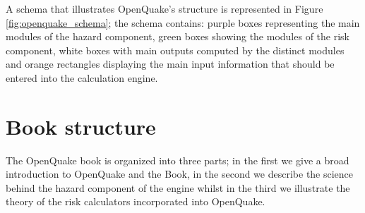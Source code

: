 A schema that illustrates OpenQuake's structure is 
represented in Figure \ref{fig:openquake_schema}; the schema contains:
purple boxes representing the main modules of the hazard component, 
green boxes showing the modules of the risk component, white boxes
with main outputs computed by the distinct modules and orange rectangles
displaying the main input information that should be entered into the calculation engine. 
%
%

%
\section{Book structure}
The OpenQuake book is organized into three parts; in the first we give
a broad introduction to OpenQuake and the Book, in the second we 
describe the science behind the hazard component of the engine
whilst in the third we illustrate the theory of the risk calculators
incorporated into OpenQuake.

